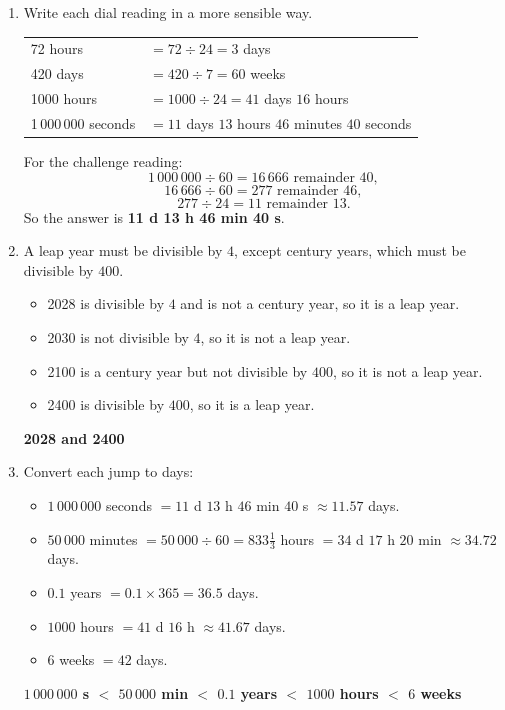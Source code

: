 \documentclass[11pt,a4paper]{article}
\newcommand{\ans}[1]{\textcolor{ttaccent}{\bfseries #1}}
\begin{document}
\begin{enumerate}[label=\textbf{\arabic*.}, leftmargin=*, start=2, itemsep=6pt]
\item Write each dial reading in a more sensible way.

\begin{center}
\begin{tabular}{@{}ll@{}}
72 hours & $=72\div24=3$ days\\[2pt]
420 days & $=420\div7=60$ weeks\\[2pt]
1000 hours & $=1000\div24=41$ days $16$ hours\\[2pt]
1\,000\,000 seconds & $=11$ days $13$ hours $46$ minutes $40$ seconds
\end{tabular}
\end{center}

For the challenge reading:
\[
1\,000\,000\div60=16\,666\text{ remainder }40,
\]
\[
16\,666\div60=277\text{ remainder }46,
\]
\[
277\div24=11\text{ remainder }13.
\]
So the answer is \ans{11 d 13 h 46 min 40 s}.

\item A leap year must be divisible by $4$, except century years, which must be divisible by $400$.
\begin{itemize}[leftmargin=1.2em, itemsep=1pt]
\item 2028 is divisible by $4$ and is not a century year, so it is a leap year.
\item 2030 is not divisible by $4$, so it is not a leap year.
\item 2100 is a century year but not divisible by $400$, so it is not a leap year.
\item 2400 is divisible by $400$, so it is a leap year.
\end{itemize}

\ans{2028 and 2400}

\item Convert each jump to days:
\begin{itemize}[leftmargin=1.2em, itemsep=1pt]
\item $1\,000\,000$ seconds $=11$ d $13$ h $46$ min $40$ s $\approx 11.57$ days.
\item $50\,000$ minutes $=50\,000\div60=833\frac13$ hours $=34$ d $17$ h $20$ min $\approx 34.72$ days.
\item $0.1$ years $=0.1\times365=36.5$ days.
\item $1000$ hours $=41$ d $16$ h $\approx 41.67$ days.
\item $6$ weeks $=42$ days.
\end{itemize}

\ans{$1\,000\,000$ s $<$ $50\,000$ min $<$ $0.1$ years $<$ $1000$ hours $<$ $6$ weeks}
\end{enumerate}
\end{document}
